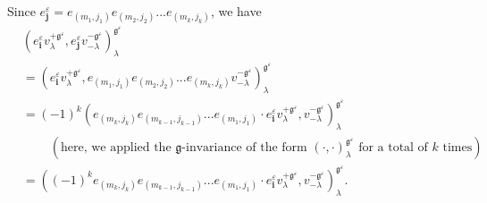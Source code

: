 \documentclass
[numbers=enddot,12pt,final,onecolumn,german,notitlepage]{scrartcl}%
\theoremstyle{definition}
\begin{document}
Since $e_{\mathbf{j}}^{\varepsilon}=e_{\left(  m_{1},j_{1}\right)  }e_{\left(
m_{2},j_{2}\right)  }...e_{\left(  m_{k},j_{k}\right)  }$, we have%
\begin{align}
&  \left(  e_{\mathbf{i}}^{\varepsilon}v_{\lambda}^{+\mathfrak{g}%
^{\varepsilon}},e_{\mathbf{j}}^{\varepsilon}v_{-\lambda}^{-\mathfrak{g}%
^{\varepsilon}}\right)  _{\lambda}^{\mathfrak{g}^{\varepsilon}}\nonumber\\
&  =\left(  e_{\mathbf{i}}^{\varepsilon}v_{\lambda}^{+\mathfrak{g}%
^{\varepsilon}},e_{\left(  m_{1},j_{1}\right)  }e_{\left(  m_{2},j_{2}\right)
}...e_{\left(  m_{k},j_{k}\right)  }v_{-\lambda}^{-\mathfrak{g}^{\varepsilon}%
}\right)  _{\lambda}^{\mathfrak{g}^{\varepsilon}}\nonumber\\
&  =\left(  -1\right)  ^{k}\left(  e_{\left(  m_{k},j_{k}\right)  }e_{\left(
m_{k-1},j_{k-1}\right)  }...e_{\left(  m_{1},j_{1}\right)  }\cdot
e_{\mathbf{i}}^{\varepsilon}v_{\lambda}^{+\mathfrak{g}^{\varepsilon}%
},v_{-\lambda}^{-\mathfrak{g}^{\varepsilon}}\right)  _{\lambda}^{\mathfrak{g}%
^{\varepsilon}}\nonumber\\
&  \ \ \ \ \ \ \ \ \ \ \left(  \text{here, we applied the }\mathfrak{g}%
\text{-invariance of the form }\left(  \cdot,\cdot\right)  _{\lambda
}^{\mathfrak{g}^{\varepsilon}}\text{ for a total of }k\text{ times}\right)
\nonumber\\
&  =\left(  \left(  -1\right)  ^{k}e_{\left(  m_{k},j_{k}\right)  }e_{\left(
m_{k-1},j_{k-1}\right)  }...e_{\left(  m_{1},j_{1}\right)  }\cdot
e_{\mathbf{i}}^{\varepsilon}v_{\lambda}^{+\mathfrak{g}^{\varepsilon}%
},v_{-\lambda}^{-\mathfrak{g}^{\varepsilon}}\right)  _{\lambda}^{\mathfrak{g}%
^{\varepsilon}}. \label{pf.invformnondeg.polynomiality.1}%
\end{align}
\end{document}
